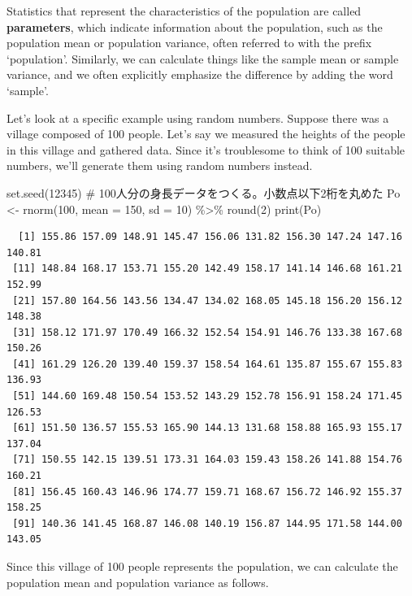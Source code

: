 \documentclass[
  a4paper,
]{book}
\newenvironment{Shaded}{\begin{snugshade}}{\end{snugshade}}
\newcommand{\AttributeTok}[1]{\textcolor[rgb]{0.40,0.45,0.13}{#1}}
\newcommand{\CommentTok}[1]{\textcolor[rgb]{0.37,0.37,0.37}{#1}}
\newcommand{\DecValTok}[1]{\textcolor[rgb]{0.68,0.00,0.00}{#1}}
\newcommand{\FunctionTok}[1]{\textcolor[rgb]{0.28,0.35,0.67}{#1}}
\newcommand{\NormalTok}[1]{\textcolor[rgb]{0.00,0.23,0.31}{#1}}
\newcommand{\OtherTok}[1]{\textcolor[rgb]{0.00,0.23,0.31}{#1}}
\newcommand{\SpecialCharTok}[1]{\textcolor[rgb]{0.37,0.37,0.37}{#1}}
\begin{document}
Statistics that represent the characteristics of the population are
called \textbf{parameters}, which indicate information about the
population, such as the population mean or population variance, often
referred to with the prefix `population'. Similarly, we can calculate
things like the sample mean or sample variance, and we often explicitly
emphasize the difference by adding the word `sample'.

Let's look at a specific example using random numbers. Suppose there was
a village composed of 100 people. Let's say we measured the heights of
the people in this village and gathered data. Since it's troublesome to
think of 100 suitable numbers, we'll generate them using random numbers
instead.

\begin{Shaded}
\begin{Highlighting}[]
\FunctionTok{set.seed}\NormalTok{(}\DecValTok{12345}\NormalTok{)}
\CommentTok{\# 100人分の身長データをつくる。小数点以下2桁を丸めた}
\NormalTok{Po }\OtherTok{\textless{}{-}} \FunctionTok{rnorm}\NormalTok{(}\DecValTok{100}\NormalTok{, }\AttributeTok{mean =} \DecValTok{150}\NormalTok{, }\AttributeTok{sd =} \DecValTok{10}\NormalTok{) }\SpecialCharTok{\%\textgreater{}\%} \FunctionTok{round}\NormalTok{(}\DecValTok{2}\NormalTok{)}
\FunctionTok{print}\NormalTok{(Po)}
\end{Highlighting}
\end{Shaded}

\begin{verbatim}
  [1] 155.86 157.09 148.91 145.47 156.06 131.82 156.30 147.24 147.16 140.81
 [11] 148.84 168.17 153.71 155.20 142.49 158.17 141.14 146.68 161.21 152.99
 [21] 157.80 164.56 143.56 134.47 134.02 168.05 145.18 156.20 156.12 148.38
 [31] 158.12 171.97 170.49 166.32 152.54 154.91 146.76 133.38 167.68 150.26
 [41] 161.29 126.20 139.40 159.37 158.54 164.61 135.87 155.67 155.83 136.93
 [51] 144.60 169.48 150.54 153.52 143.29 152.78 156.91 158.24 171.45 126.53
 [61] 151.50 136.57 155.53 165.90 144.13 131.68 158.88 165.93 155.17 137.04
 [71] 150.55 142.15 139.51 173.31 164.03 159.43 158.26 141.88 154.76 160.21
 [81] 156.45 160.43 146.96 174.77 159.71 168.67 156.72 146.92 155.37 158.25
 [91] 140.36 141.45 168.87 146.08 140.19 156.87 144.95 171.58 144.00 143.05
\end{verbatim}

Since this village of 100 people represents the population, we can
calculate the population mean and population variance as follows.
\end{document}
